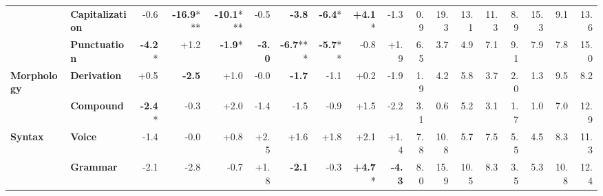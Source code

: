\begin{table}[h]
{\begin{tabular}{llrrrrrrrrrrrrrrrr}
  & \textbf{Capitalization} & \cellcolor{red!1} -0.6 & \cellcolor{red!20} \textbf{-16.9}*** & \cellcolor{red!20} \textbf{-10.1}*** & \cellcolor{red!1} -0.5 & \cellcolor{red!7} \textbf{-3.8} & \cellcolor{red!12} \textbf{-6.4}* & \cellcolor{green!8} \textbf{+4.1}* & \cellcolor{red!2} -1.3 & \cellcolor{blue!2} 0.9 & \cellcolor{blue!50} 19.3 & \cellcolor{blue!34} 13.1 & \cellcolor{blue!29} 11.3 & \cellcolor{blue!23} 8.9 & \cellcolor{blue!40} 15.3 & \cellcolor{blue!24} 9.1 & \cellcolor{blue!35} 13.6 \\
  & \textbf{Punctuation} & \cellcolor{red!8} \textbf{-4.2}* & \cellcolor{green!2} +1.2 & \cellcolor{red!3} \textbf{-1.9}* & \cellcolor{red!5} \textbf{-3.0} & \cellcolor{red!13} \textbf{-6.7}*** & \cellcolor{red!11} \textbf{-5.7}** & \cellcolor{red!1} -0.8 & \cellcolor{green!3} +1.9 & \cellcolor{blue!17} 6.5 & \cellcolor{blue!10} 3.7 & \cellcolor{blue!13} 4.9 & \cellcolor{blue!18} 7.1 & \cellcolor{blue!24} 9.1 & \cellcolor{blue!20} 7.9 & \cellcolor{blue!20} 7.8 & \cellcolor{blue!39} 15.0 \\
\midrule
\textbf{Morphology} & \textbf{Derivation} & \cellcolor{green!0} +0.5 & \cellcolor{red!4} \textbf{-2.5} & \cellcolor{green!2} +1.0 & \cellcolor{red!0} -0.0 & \cellcolor{red!3} \textbf{-1.7} & \cellcolor{red!2} -1.1 & \cellcolor{green!0} +0.2 & \cellcolor{red!3} -1.9 & \cellcolor{blue!5} 1.9 & \cellcolor{blue!11} 4.2 & \cellcolor{blue!15} 5.8 & \cellcolor{blue!9} 3.7 & \cellcolor{blue!5} 2.0 & \cellcolor{blue!3} 1.3 & \cellcolor{blue!25} 9.5 & \cellcolor{blue!21} 8.2 \\
  & \textbf{Compound} & \cellcolor{red!4} \textbf{-2.4}* & \cellcolor{red!0} -0.3 & \cellcolor{green!4} +2.0 & \cellcolor{red!2} -1.4 & \cellcolor{red!2} -1.5 & \cellcolor{red!1} -0.9 & \cellcolor{green!2} +1.5 & \cellcolor{red!4} -2.2 & \cellcolor{blue!8} 3.1 & \cellcolor{blue!2} 0.6 & \cellcolor{blue!13} 5.2 & \cellcolor{blue!8} 3.1 & \cellcolor{blue!4} 1.7 & \cellcolor{blue!3} 1.0 & \cellcolor{blue!18} 7.0 & \cellcolor{blue!33} 12.9 \\
\midrule
\textbf{Syntax} & \textbf{Voice} & \cellcolor{red!2} -1.4 & \cellcolor{red!0} -0.0 & \cellcolor{green!1} +0.8 & \cellcolor{green!4} +2.5 & \cellcolor{green!3} +1.6 & \cellcolor{green!3} +1.8 & \cellcolor{green!4} +2.1 & \cellcolor{green!2} +1.4 & \cellcolor{blue!20} 7.8 & \cellcolor{blue!28} 10.8 & \cellcolor{blue!15} 5.7 & \cellcolor{blue!19} 7.5 & \cellcolor{blue!14} 5.5 & \cellcolor{blue!11} 4.5 & \cellcolor{blue!21} 8.3 & \cellcolor{blue!29} 11.3 \\
  & \textbf{Grammar} & \cellcolor{red!4} -2.1 & \cellcolor{red!5} -2.8 & \cellcolor{red!1} -0.7 & \cellcolor{green!3} +1.8 & \cellcolor{red!4} \textbf{-2.1} & \cellcolor{red!0} -0.3 & \cellcolor{green!9} \textbf{+4.7}* & \cellcolor{red!8} \textbf{-4.3} & \cellcolor{blue!21} 8.0 & \cellcolor{blue!41} 15.9 & \cellcolor{blue!27} 10.5 & \cellcolor{blue!21} 8.3 & \cellcolor{blue!9} 3.5 & \cellcolor{blue!14} 5.3 & \cellcolor{blue!28} 10.8 & \cellcolor{blue!32} 12.4 \\

\end{tabular}}
\end{table}
